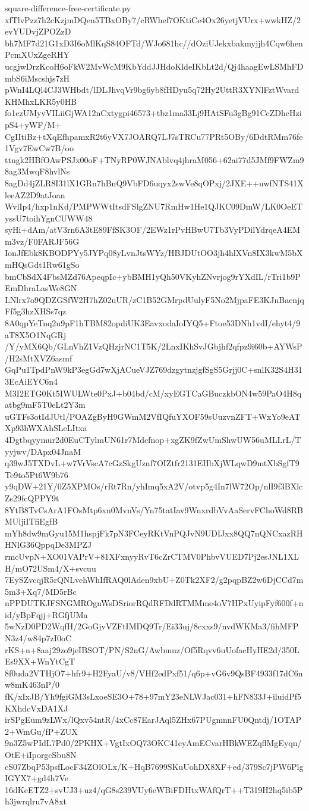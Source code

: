 \documentclass[11pt]{article}
\theoremstyle{definition}
\theoremstyle{remark}
\begin{document}
\begin{filecontents*}[overwrite]{square-difference-free-certificate.py}
xfTlvPzz7h2cKzjmDQen5TBxOBy7/cRWhef7OKtiCe4Ox26yetjVUrx+wwkHZ/2evYUDvjZPOZzD
bh7MF7d21G1xD3I6oMlKqS84OFTd/WJo681hc//dOziUJekxbakmyjjh4Cqw6henPcmXUxZgeRHY
ucgjwDrzKcoH6oFkW2MvWcM9KbYddJJHdoKldeIKbLt2d/Qj4haagEwLSMhFDmbS6iMscshjs7zH
pWnI4LQl4CJ3WHbdt/lDLJhvqVr9bg6yb8fHDyu5q72Hy2UttR3XYNlFztWvardKHMhxLKR5y0HB
fo1czUMyvVILiiGjWA12nCxtygpi46573+tbz1ma33Lj9HAtSFu3gBg91CcZDhcHzipS4+yWF/M+
CgIItiBz+tXqEfhpamxR2t6yVX7JOARQ7LJ7sTRCu77PRt5OBy/6DdtRMm76fe1Vgv7EwCw7B/oo
ttngk2HBfOAwPSJx00oF+TNyRP0WJNAblvq4jhraM056+62ai77d5JMf9FWZm98ag3MwqF8hvlNs
8agDd4jZLR8I31lX1GRn7hBnQ9VbFD6uqyx2swVe8qOPxj/2JXE++uwfNTS41XleeAZ2D9atJoan
WvlIp4/hxp1nKd/PMPWWtItsdFSlgZNU7RmHw1He1QJKC09DmW/LK0OeETyssU7toihYgnCUWW48
syHi+dAm/atV3rn6A3tE89FfSK3OF/2EWz1rPvHBwU7Tb3VyPDilYdrqeA4EMm3vz/F0FARJF56G
IonJfEbk8KBODPYy5JYPq08yLvnJtsWYz/HBJDUtOO3jh4hlXVn8IX3kwM5bXmHQsGdt1Rw61gSo
bmCbSdX4FbsMZd76ApeqpIc+ybBMH1yQh50VKyhZNvrjog9rYXdIL/rTri1b9PEmDhraLasWe8GN
LNlrx7o9QDZGSfW2H7hZ02uUR/zC1B52GMrpdUulyF5No2MjpaFE3KJnBacnjqFf5g3hzXHSs7qz
8A0qpYeTnq2u9pF1hTBM82opdiUK3EavxodaIoIYQ5+Ftoe53DNh1vdI/ehyt4/9aT8X5O1NqGRj
/Y/yMX6Qb/GLnVhZ1VzQHzjrNC1T5K/2LnxIKhSvJGbjhf2qfpz9i60b+AYWsP/H2sMtXVZ6asmf
GqPu1TpdPnW9kP3egGd7wXjACueVJZ769dzgytnzjgfSgS5Grjj0C+snlK32S4H313EcAiEYC6n4
M3I2ETG0Kt5IWULWte0PxJ+b04bd/cM/xyEGTCaGBuczkbON4w59PaO4H8qatbg9mF5T0eLt2Y3m
uGTFs3otIdJUtl/POAZgByH9GWmM2VfIQfuYXOF59sUuzvnZFT+WxYo9eATXp93hWXAhSLeLItxa
4Dgtbqyymur2d0EuCTylmUN61r7Mdcfnop+xgZK9fZwUmShwUW56uMLLrL/Tyyjwv/DApx04JnaM
q39wJ5TXDvL+w7VrVscA7cGzSkgUznf7OIZtfr2131EHbXjWLqwD9mtXbSgfT9Te9to5Pt6W9b76
y9qDW+21Y/0Z5XPMOs/rRt7Rn/yhImq5xA2V/otvp5g4In7lW72Op/nlI9f3BXlcZs29fcQPPY9t
8YtB8TvCsArA1FOsMtp6xn0MvnVs/Yn75tatIav9WnxrdbVvAaServFChoWd8RBMUljiITfiEgfB
mYh8dw9mGyu15M1hspjFk7pN3FCeyRKtVnPQJvN9UDIJxx8QQ7nQNCxazRHHNlG36QppqDe3MPZJ
rmcUvpN+XO01VAPrV+81XFxnyyRvT6cZrCTMV0PhbvVUED7Pj2esJNL1XLH/mO72USm4/X+svcuu
7EySZvcqjR5rQNLvehWhIfRAQ0lAden9xbU+Z0Tk2XF2/g2pqpBZ2w6DjCCd7m5m3+Xq7/MD5rBc
nPPDUTKJFSNGMROgnWsDSriorRQdRFDdRTMMme4oV7HPxUyipFyf600f+nid/yBpFqjj+RGfjUMa
5wNzD0PD2WqfH/2GoGjvVZFtIMDQ9Tr/Ei33uj/8cxxs9/nvdWKMa3/fihMFPN3z4/w84p7zI0oC
rKS+n+8aaj29zo9jeIBSOT/PN/S2nG/Awbmuz/Of5Rqvv6uUofacHyHE2d/350LEs9XX+WnYtCgT
8f0uda2VTHjO7+hfr9+H2FyaU/v8/VHf2edPxf51/q6p+vG6v9QsBF4933f17dC6nw8mK463nP/0
fK/xIxJB/Yh9fgiGM3sLxoeSE3O+78+97mY23eNLWJac031+hFN833J+iluidPf5KXhdcVxDA1XJ
irSPgEum9zLWx/lQxv54ntR/4xCc87EarJAql5ZHx67PUgmnnFU0Qntdj/1OTAP2+WmGu/fP+ZUX
9n3Z5wPIdL7Pd0/2PKHX+VgtIxOQ73OKC41eyAmECvarHBkWEZqflMgEyqn/OtE+iIporgcSbu8N
cS07ZbqP53psfLocF34ZOlOLx/K+HqB7699SKuUohDX8XF+ed/379Sc7jPW6PlgIGYX7+gd4h7Ve
16dKeETZ2+svUJ3+uz4/qG8s239VUy6eWBiFDHtxWAfQrT++T319H2hq5ib5Ph3jwrqlru7vA8xt

\end{filecontents*}
\end{document}
